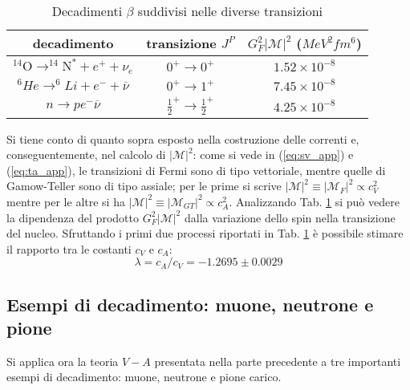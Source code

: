 \documentclass{subnucbo}
\begin{document}
\begin{table}
        \centering
        \begin{tabular}{c  c  c}
                \hline
                decadimento & transizione $J^{P}$ & $G _ { F } ^ { 2 } | \mathcal { M } | ^ { 2 }$ ($MeV^{2}fm^{6}$) \\
                \hline
                $^ { 14 } \mathrm { O } \rightarrow ^ { 14 } \mathrm { N } ^ { * } + e ^ { + } + \nu _ { e }$ & $0 ^ { + } \rightarrow 0 ^ { + }$ & $1.52 \times 10 ^ { - 8 }$ \\
                $^{6}H e \rightarrow^ { 6 } L i + e ^ { - } + \overline { \nu }$ & $0^{+} \rightarrow 1^{+}$ & $7.45 \times 10 ^ { - 8 }$ \\
                $n \rightarrow p e ^ { - } \overline { \nu }$ & $\frac { 1 } { 2 }^{+} \rightarrow \frac { 1 } { 2 } ^ { + }$ & $4.25 \times 10 ^ { - 8 }$ \\
                \hline
        \end{tabular}
        \caption{Decadimenti $\beta$ suddivisi nelle diverse transizioni}
        \label{tab:beta_decays}
\end{table}
Si tiene conto di quanto sopra esposto nella costruzione delle correnti e, conseguentemente, nel calcolo di $|\mathcal{M}|^{2}$: come si vede in (\ref{eq:sv_app}) e (\ref{eq:ta_app}), le transizioni di Fermi sono di tipo vettoriale, mentre quelle di Gamow-Teller sono di tipo assiale; per le prime si scrive $| \mathcal { M } | ^ { 2 } \equiv \left| \mathcal { M } _ { F } \right| ^ { 2 } \propto c _ { V } ^ { 2 }$ mentre per le altre si ha $| \mathcal { M } | ^ { 2 } \equiv \left| \mathcal { M } _ { G T } \right| ^ { 2 } \propto c _ { A } ^ { 2 }$. Analizzando Tab. \ref{tab:beta_decays} si può vedere la dipendenza del prodotto $G_{F}^{2}|\mathcal{M}|^{2}$ dalla variazione dello spin nella transizione del nucleo.
Sfruttando i primi due processi riportati in Tab. \ref{tab:beta_decays} è possibile stimare \cite{ref:BGSex} il rapporto tra le costanti $c_{V}$ e $c_{A}$:
\begin{equation}
        \lambda = c _ { A } / c _ { V } = - 1.2695 \pm 0.0029
        \label{eq:ca_cv}
\end{equation}
\subsection{Esempi di decadimento: muone, neutrone e pione}
\label{subsec:decays}
Si applica ora la teoria $V-A$ presentata nella parte precedente a tre importanti esempi di decadimento: muone, neutrone e pione carico.
\end{document}
